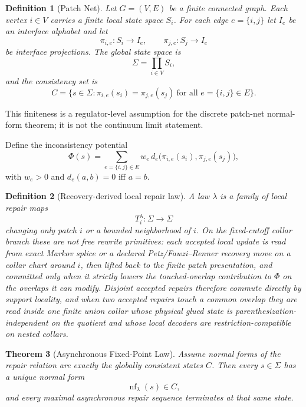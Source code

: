 \documentclass[11pt]{article}
\newtheorem{theorem}{Theorem}[section]
\newtheorem{definition}[theorem]{Definition}
\newcommand{\nf}{\operatorname{nf}}
\begin{document}
\begin{definition}[Patch Net]\label{def:patchnet}
Let $G=(V,E)$ be a finite connected graph. Each vertex $i\in V$ carries a finite local state space $S_i$. For each edge $e=\{i,j\}$ let $I_e$ be an interface alphabet and let
\[
\pi_{i,e}:S_i\to I_e,
\qquad
\pi_{j,e}:S_j\to I_e
\]
be interface projections. The global state space is
\[
\Sigma=\prod_{i\in V} S_i,
\]
and the consistency set is
\[
C=\bigl\{s\in\Sigma:\pi_{i,e}(s_i)=\pi_{j,e}(s_j)\ \text{for all }e=\{i,j\}\in E\bigr\}.
\]
\end{definition}

This finiteness is a regulator-level assumption for the discrete patch-net normal-form theorem; it is not the continuum limit statement.

Define the inconsistency potential
\[
\Phi(s)=\sum_{e=\{i,j\}\in E}w_e\, d_e\!\bigl(\pi_{i,e}(s_i),\pi_{j,e}(s_j)\bigr),
\]
with $w_e>0$ and $d_e(a,b)=0$ iff $a=b$.

\begin{definition}[Recovery-derived local repair law]
A law $\lambda$ is a family of local repair maps
\[
T_i^\lambda:\Sigma\to\Sigma
\]
changing only patch $i$ or a bounded neighborhood of $i$. On the fixed-cutoff collar branch these
are not free rewrite primitives: each accepted local update is read from exact Markov splice or a
declared Petz/Fawzi--Renner recovery move on a collar chart around \(i\), then lifted back to the
finite patch presentation, and committed only when it strictly lowers the touched-overlap
contribution to \(\Phi\) on the overlaps it can modify. Disjoint accepted repairs therefore
commute directly by support locality, and when two accepted repairs touch a common overlap they are read inside one
finite union collar whose physical glued state is parenthesization-independent on the quotient and
whose local decoders are restriction-compatible on nested collars.
\end{definition}

\begin{theorem}[Asynchronous Fixed-Point Law]\label{thm:confluence}
Assume normal forms of the repair relation are exactly the globally consistent states $C$.
Then every $s\in\Sigma$ has a unique normal form
\[
\nf_\lambda(s)\in C,
\]
and every maximal asynchronous repair sequence terminates at that same state.
\end{theorem}
\end{document}

